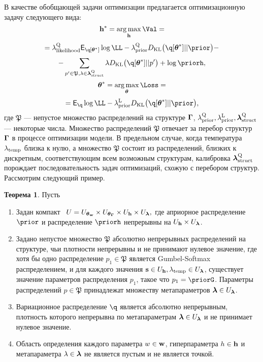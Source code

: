 \documentclass[11pt, a5paper]{dissert}
\theoremstyle{definition}
\newtheorem{theorem}{Теорема}
\DeclareMathOperator*{\argmax}{arg\,max}
\begin{document}
{В качестве обобщающей задачи оптимизации предлагается оптимизационную задачу следующего вида:
\begin{equation}
\label{eq:qopt}
\h^{*} = \argmax_{\h} \Val = 
\end{equation}
\[
= \lamLL \E_{\q[\teta^{*}]} \log\LL - \lamCQ \KL{\q[\teta^{*}]}{\prior} -
\]
\[
    - \sum_{p' \in \mathfrak{P},\lambda \in \lamS} \lambda\KL{\q[\teta^{*}]}{p'} + \log\priorh, 
\]
\begin{equation}
\label{eq:lopt}
{\teta}^{*} = \argmax_{\teta} \Loss = 
\end{equation}
\[=
\E_{\q} \log \LL - \lamCL \KL{\q[\teta^{*}]}{\prior},
\]
где $\mathfrak{P}$ --- непустое множество распределений на структуре $\boldsymbol{\Gamma}$, $\lambda_\text{prior}^\text{Q}, \lambda_\text{prior}^\text{L}, \boldsymbol{\lambda}_\text{struct}^\text{Q}$  --- некоторые числа. Множество распределений $\mathfrak{P}$ отвечает за перебор структур $\boldsymbol{\Gamma}$ в процессе оптимизации модели.
В предельном случае, когда температура $\lambda_{\text{temp}}$ близка к нулю, а множество $\mathfrak{P}$ состоит из распределений, близких к дискретным, соответствующим всем возможным структурам, калибровка $\boldsymbol{\lambda}_\text{struct}^\text{Q}$ порождает последовательность задач оптимизаций, схожую с перебором структур. Рассмотрим следующий пример. 

\begin{theorem}
Пусть
\begin{enumerate}%

\item Задан компакт  $U = U_{\boldsymbol{\theta}_\mathbf{w}} \times U_{\boldsymbol{\theta}_{\boldsymbol{\Gamma}}} \times U_{\mathbf{h}} \times U_{\boldsymbol{\lambda}},$ где априорное распределение $\prior$ и распределение $\priorh$ непрерывны на $U_{\mathbf{h}} \times U_{\boldsymbol{\lambda}}$.

\item Задано непустое множество  $\mathfrak{P}$ абсолютно непрерывных распределений на структуре, чьи плотности непрерывны и не принимают нулевое значение, где хотя бы одно распределение $p_1 \in \mathfrak{P}$ является Gumbel-Softmax распределением, и для каждого значения $\mathbf{s} \in U_{\mathbf{h}}, \lambda_{\text{temp}} \in U_{\boldsymbol{\lambda}}$, существует значение параметров распределения $p_1$, такое что $p_1 = \priorG$. Параметры распределений $p \in \mathfrak{P}$ принадлежат множеству метапараметров $\boldsymbol{\lambda} \in U_{\boldsymbol{\lambda}}$.

\item Вариационное распределение $\q$ является  абсолютно непрерывным, плотность которого непрерывна по метапараметрам $\boldsymbol{\lambda} \in U_{\boldsymbol{\lambda}}$ и не принимает нулевое значение.

\item Область определения каждого параметра $w \in\mathbf{w}$, гиперпараметра $h \in \mathbf{h}$ и метапараметра $\lambda \in \boldsymbol{\lambda}$ не является пустым и не является точкой.


\end{enumerate}
\end{theorem}}
\end{document}
